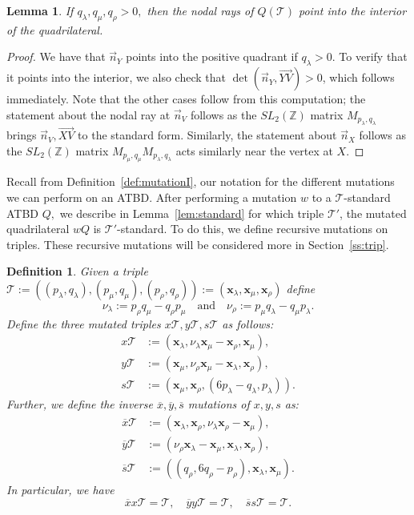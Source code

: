 \documentclass[11pt, reqno]{amsart}
\newtheorem{lemma}[thm]{Lemma}
\newtheorem{definition}[thm]{Definition}
\theoremstyle{remark}
\numberwithin{equation}{subsection}
\numberwithin{figure}{section}
\theoremstyle{customremark}
\newcommand{\Tt}{\mathcal{T}}
\newcommand{\vn}{{\vec{n}}}
\newcommand{\ovr}{\overrightarrow}
\newcommand{\ov}{\overline}
\newcommand{\la}{{\lambda}}
\newcommand{\Z}{\mathbb{Z}}
\begin{document}
\begin{lemma}\label{lem:nodalPos}
    If $q_\la,q_\mu,q_\rho>0,$ then the nodal rays of $Q(\Tt)$ point into the interior of the quadrilateral. 
\end{lemma}
\begin{proof}
    We have that $\vn_Y$ points into the positive quadrant if $q_\la>0.$ To verify that it points into the interior, we also check that $\det(\vn_Y,\ovr{YV})>0$, which follows immediately. Note that the other cases follow from this computation; the statement about the nodal ray at $\vn_V$ follows as the $SL_2(\Z)$ matrix $M_{p_\la,q_\la}$ brings $\vn_V,\ovr{XV}$ to the standard form. Similarly, the statement about $\vn_X$ follows as the $SL_2(\Z)$ matrix $M_{p_\mu,q_\mu}M_{p_\la,q_\la}$ acts similarly near the vertex at $X.$
\end{proof}

Recall from Definition~\ref{def:mutationI}, our notation for the different mutations we can perform on an ATBD. After performing a mutation $w$ to a $\Tt$-standard ATBD $Q,$ we describe in Lemma~\ref{lem:standard} for which triple $\Tt'$, the mutated quadrilateral $wQ$ is $\Tt'$-standard. To do this, we define recursive mutations on triples. These recursive mutations will be considered more in Section~\ref{ss:trip}.
\begin{definition}
\label{def:mutTrip}
 Given a triple $\Tt:=\left((p_\la,q_\la),(p_\mu,q_\mu),(p_\rho,q_\rho)\right):=(\bm{x}_\la,\bm{x}_\mu,\bm{x}_\rho)$ define 
 \[ \nu_\la:=p_\rho q_\mu-q_\rho p_\mu \quad \text{and} \quad \nu_\rho:=p_\mu q_\la-q_\mu p_\la.\] Define the three mutated triples $x\Tt,y\Tt,s\Tt$ as follows: 
  \begin{align*}
    x\Tt &:=\left(\bm{x}_\la,\nu_\la\bm{x}_\mu-\bm{x}_\rho,\bm{x}_\mu 
     \right), \\
    y\Tt &:=\left(\bm{x}_\mu,\nu_\rho \bm{x}_\mu-\bm{x}_\la,\bm{x}_\rho\right), \\
     s\Tt &:=\left(\bm{x}_\mu,\bm{x}_\rho,(6p_\la-q_\la,p_\la)\right).
 \end{align*}
 Further, we define the inverse $\ov{x},\ov{y},\ov{s}$ mutations of $x,y,s$ as: 
\begin{align*}
    \ov{x}\Tt &:=\left(\bm{x}_\la,\bm{x}_\rho,\nu_\la \bm{x}_\rho-\bm{x}_\mu
    \right), \\
    \ov{y}\Tt &:=\left(\nu_\rho \bm{x}_\la-\bm{x}_\mu,\bm{x}_\la,\bm{x}_\rho \right), \\
    \ov{s}\Tt &:=\left((q_\rho,6q_\rho-p_\rho),\bm{x}_\la,\bm{x}_\mu\right). 
\end{align*}
In particular, we have
\[ \ov{x}x\Tt=\Tt, \quad \ov{y}y\Tt=\Tt, \quad \ov{s}s\Tt=\Tt.\]
\end{definition}
\end{document}
